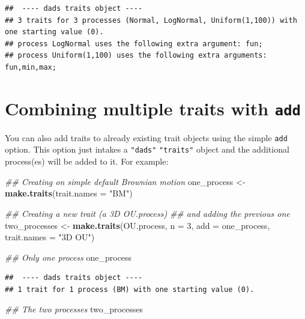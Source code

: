 \documentclass[]{book}
\newenvironment{Shaded}{\begin{snugshade}}{\end{snugshade}}
\newcommand{\CommentTok}[1]{\textcolor[rgb]{0.56,0.35,0.01}{\textit{#1}}}
\newcommand{\DataTypeTok}[1]{\textcolor[rgb]{0.13,0.29,0.53}{#1}}
\newcommand{\DecValTok}[1]{\textcolor[rgb]{0.00,0.00,0.81}{#1}}
\newcommand{\KeywordTok}[1]{\textcolor[rgb]{0.13,0.29,0.53}{\textbf{#1}}}
\newcommand{\NormalTok}[1]{#1}
\newcommand{\StringTok}[1]{\textcolor[rgb]{0.31,0.60,0.02}{#1}}
\begin{document}
\begin{verbatim}
##  ---- dads traits object ---- 
## 3 traits for 3 processes (Normal, LogNormal, Uniform(1,100)) with one starting value (0).
## process LogNormal uses the following extra argument: fun;
## process Uniform(1,100) uses the following extra arguments: fun,min,max;
\end{verbatim}

\hypertarget{combining-multiple-traits-with-add}{%
\section{\texorpdfstring{Combining multiple traits with \texttt{add}}{Combining multiple traits with add}}\label{combining-multiple-traits-with-add}}

You can also add traits to already existing trait objects using the simple \texttt{add} option.
This option just intakes a \texttt{"dads"} \texttt{"traits"} object and the additional process(es) will be added to it. For example:

\begin{Shaded}
\begin{Highlighting}[]
\CommentTok{## Creating on simple default Brownian motion}
\NormalTok{one_process <-}\StringTok{ }\KeywordTok{make.traits}\NormalTok{(}\DataTypeTok{trait.names =} \StringTok{"BM"}\NormalTok{)}

\CommentTok{## Creating a new trait (a 3D OU.process)}
\CommentTok{## and adding the previous one}
\NormalTok{two_processes <-}\StringTok{ }\KeywordTok{make.traits}\NormalTok{(OU.process, }\DataTypeTok{n =} \DecValTok{3}\NormalTok{, }\DataTypeTok{add =}\NormalTok{ one_process,}
                             \DataTypeTok{trait.names =} \StringTok{"3D OU"}\NormalTok{)}

\CommentTok{## Only one process}
\NormalTok{one_process}
\end{Highlighting}
\end{Shaded}

\begin{verbatim}
##  ---- dads traits object ---- 
## 1 trait for 1 process (BM) with one starting value (0).
\end{verbatim}

\begin{Shaded}
\begin{Highlighting}[]
\CommentTok{## The two processes}
\NormalTok{two_processes}
\end{Highlighting}
\end{Shaded}
\end{document}
